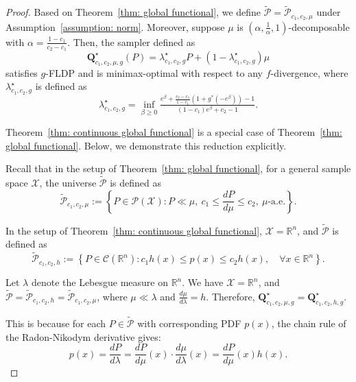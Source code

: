 \documentclass[accepted]{article}
\theoremstyle{plain} %
\theoremstyle{definition}
\theoremstyle{remark}
\newcommand{\bQ}{\mathbf{Q}}
\begin{document}
\begin{proof}
  
Based on Theorem~\ref{thm: global functional}, we define \( \tilde{\mathcal{P}} = \tilde{\mathcal{P}}_{c_1, c_2, \mu} \) under Assumption~\ref{assumption: norm}. Moreover, suppose \( \mu \) is \( \left(\alpha, \frac{1}{\alpha}, 1\right) \)-decomposable with \( \alpha = \frac{1 - c_1}{c_2 - c_1} \). Then, the sampler defined as
\[
\bQ^\star_{c_1,c_2,\mu,g}(P) = \lambda^\star_{c_1,c_2,g} P + \left(1 - \lambda^\star_{c_1,c_2,g}\right) \mu
\]
satisfies $g$-FLDP and is minimax-optimal with respect to any $f$-divergence, where \( \lambda_{c_1,c_2,g}^\star \) is defined as
\[
\lambda^\star_{c_1,c_2,g} = \inf_{\beta \geq 0} 
\tfrac{e^\beta + \frac{c_2 - c_1}{1 - c_1} ( 1 + g^*(-e^\beta)) - 1}
     {(1 - c_1)e^\beta + c_2 - 1}.
\]

Theorem~\ref{thm: continuous global functional} is a special case of Theorem~\ref{thm: global functional}. Below, we demonstrate this reduction explicitly.

Recall that in the setup of Theorem~\ref{thm: global functional}, for a general sample space \( \mathcal{X} \), the universe \( \tilde{\mathcal{P}} \) is defined as
\[
\tilde{\mathcal{P}}_{c_1, c_2, \mu}
:= \left\{P\in \mathcal{P}(\mathcal{X}) : P \ll \mu,\ c_1 \leq \frac{dP}{d\mu} \leq c_2,\ \mu\text{-a.e.} \right\}.
\]

In the setup of Theorem~\ref{thm: continuous global functional}, \( \mathcal{X} = \mathbb{R}^n \), and \( \tilde{\mathcal{P}} \) is defined as
\[
\tilde{\mathcal{P}}_{c_1, c_2, h} := \left\{ P \in \mathcal{C}(\mathbb{R}^n) : c_1 h(x) \leq p(x) \leq c_2 h(x),\quad \forall x \in \mathbb{R}^n \right\}.
\]


Let \( \lambda \) denote the Lebesgue measure on \( \mathbb{R}^n \). We have \( \mathcal{X} = \mathbb{R}^n \), and \( \tilde{\mathcal{P}} = \tilde{\mathcal{P}}_{c_1, c_2, h} = \tilde{\mathcal{P}}_{c_1, c_2, \mu} \), where \( \mu \ll \lambda \) and \( \frac{d\mu}{d\lambda} = h \). Therefore, \( \bQ^\star_{c_1,c_2,\mu,g} = \bQ^\star_{c_1,c_2,h,g} \).

This is because for each \( P \in \tilde{\mathcal{P}} \) with corresponding PDF \( p(x) \), the chain rule of the Radon-Nikodym derivative gives:
\[
p(x) = \frac{dP}{d\lambda} = \frac{dP}{d\mu}(x) \cdot \frac{d\mu}{d\lambda}(x) = \frac{dP}{d\mu}(x) h(x).
\]


\end{proof}
\end{document}

